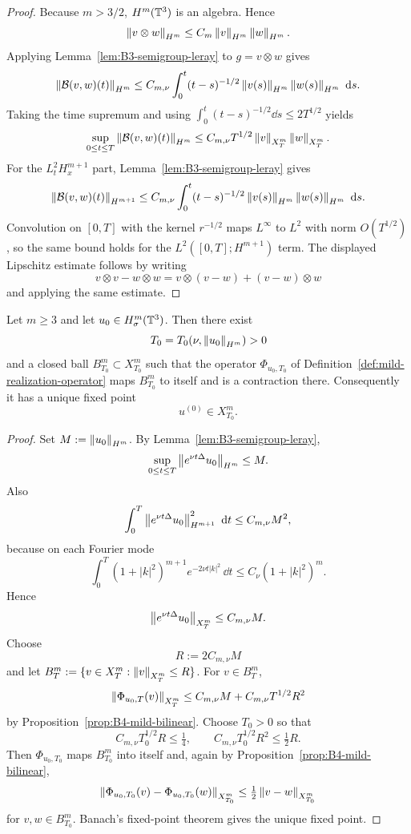\begin{proof}
Because $m>3/2$, $H^m(\mathbb{T}^3)$ is an algebra. Hence
\[
\left\lVert v\otimes w\right\rVert_{H^m}\le C_m \left\lVert v\right\rVert_{H^m}\left\lVert w\right\rVert_{H^m}.
\]
Applying Lemma~\ref{lem:B3-semigroup-leray} to $g=v\otimes w$ gives
\[
\left\lVert \mathcal B(v,w)(t)\right\rVert_{H^m}
\le
C_{m,\nu}\int_0^t (t-s)^{-1/2}\left\lVert v(s)\right\rVert_{H^m}\left\lVert w(s)\right\rVert_{H^m}\,\,\mathrm{d} s.
\]
Taking the time supremum and using $\int_0^t (t-s)^{-1/2}\dd s\le 2T^{1/2}$ yields
\[
\sup_{0\le t\le T}\left\lVert \mathcal B(v,w)(t)\right\rVert_{H^m}
\le
C_{m,\nu}T^{1/2}\left\lVert v\right\rVert_{X_T^m}\left\lVert w\right\rVert_{X_T^m}.
\]
For the $L^2_tH^{m+1}_x$ part, Lemma~\ref{lem:B3-semigroup-leray} gives
\[
\left\lVert \mathcal B(v,w)(t)\right\rVert_{H^{m+1}}
\le
C_{m,\nu}\int_0^t (t-s)^{-1/2}\left\lVert v(s)\right\rVert_{H^m}\left\lVert w(s)\right\rVert_{H^m}\,\,\mathrm{d} s.
\]
Convolution on $[0,T]$ with the kernel $r^{-1/2}$ maps $L^\infty$ to $L^2$ with norm
$O(T^{1/2})$, so the same bound holds for the $L^2([0,T];H^{m+1})$ term. The displayed Lipschitz
estimate follows by writing
\[
v\otimes v-w\otimes w = v\otimes(v-w)+(v-w)\otimes w
\]
and applying the same estimate.
\end{proof}

\begin{manualtheorem}
\label{thm:B5-local-mild-window}
Let $m\ge 3$ and let $u_0\in H^m_\sigma(\mathbb{T}^3)$. Then there exist
\[
T_0=T_0(\nu,\left\lVert u_0\right\rVert_{H^m})>0
\]
and a closed ball $B_{T_0}^m\subset X_{T_0}^m$ such that the operator $\Phi_{u_0,T_0}$ of
Definition~\ref{def:mild-realization-operator} maps $B_{T_0}^m$ to itself and is a contraction there.
Consequently it has a unique fixed point
\[
u^{(0)}\in X_{T_0}^m.
\]
\end{manualtheorem}

\begin{proof}
Set $M:=\left\lVert u_0\right\rVert_{H^m}$. By Lemma~\ref{lem:B3-semigroup-leray},
\[
\sup_{0\le t\le T}\left\lVert e^{\nu t\Delta}u_0\right\rVert_{H^m}\le M.
\]
Also
\[
\int_0^T \left\lVert e^{\nu t\Delta}u_0\right\rVert_{H^{m+1}}^2\,\,\mathrm{d} t
\le
C_{m,\nu} M^2,
\]
because on each Fourier mode
\[
\int_0^T (1+|k|^2)^{m+1}e^{-2\nu t|k|^2}\,\dd t
\le
C_\nu (1+|k|^2)^m.
\]
Hence
\[
\left\lVert e^{\nu t\Delta}u_0\right\rVert_{X_T^m}\le C_{m,\nu}M.
\]
Choose
\[
R:=2C_{m,\nu}M
\]
and let $B_T^m:=\{v\in X_T^m:\left\lVert v\right\rVert_{X_T^m}\le R\}$. For $v\in B_T^m$,
\[
\left\lVert \Phi_{u_0,T}(v)\right\rVert_{X_T^m}
\le C_{m,\nu}M + C_{m,\nu}T^{1/2}R^2
\]
by Proposition~\ref{prop:B4-mild-bilinear}. Choose $T_0>0$ so that
\[
C_{m,\nu}T_0^{1/2}R\le \tfrac14,
\qquad
C_{m,\nu}T_0^{1/2}R^2\le \tfrac12 R.
\]
Then $\Phi_{u_0,T_0}$ maps $B_{T_0}^m$ into itself and, again by
Proposition~\ref{prop:B4-mild-bilinear},
\[
\left\lVert \Phi_{u_0,T_0}(v)-\Phi_{u_0,T_0}(w)\right\rVert_{X_{T_0}^m}
\le \tfrac12 \left\lVert v-w\right\rVert_{X_{T_0}^m}
\]
for $v,w\in B_{T_0}^m$. Banach's fixed-point theorem gives the unique fixed point.
\end{proof}


